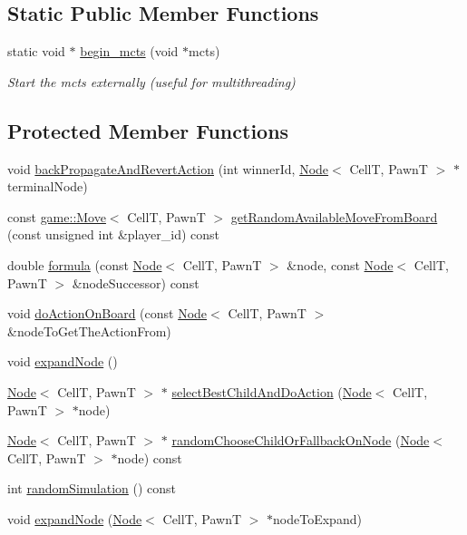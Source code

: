 \subsection*{Static Public Member Functions}
\begin{DoxyCompactItemize}
\item 
static void $\ast$ \hyperlink{classmcts_1_1_m_c_t_s_ab1b102cd67bb285c669f3fbb405ef5aa}{begin\+\_\+mcts} (void $\ast$mcts)
\begin{DoxyCompactList}\small\item\em Start the mcts externally (useful for multithreading) \end{DoxyCompactList}\end{DoxyCompactItemize}
\subsection*{Protected Member Functions}
\begin{DoxyCompactItemize}
\item 
void \hyperlink{classmcts_1_1_m_c_t_s_a53275dba0c93543b2fa8c24ad928e4a8}{back\+Propagate\+And\+Revert\+Action} (int winner\+Id, \hyperlink{structmcts_1_1_node}{Node}$<$ CellT, PawnT $>$ $\ast$terminal\+Node)
\item 
const \hyperlink{structgame_1_1_move}{game\+::\+Move}$<$ CellT, PawnT $>$ \hyperlink{classmcts_1_1_m_c_t_s_a3e918b416dfe1e5155b077788936f137}{get\+Random\+Available\+Move\+From\+Board} (const unsigned int \&player\+\_\+id) const
\item 
double \hyperlink{classmcts_1_1_m_c_t_s_ac75ac1b12fbb40dca468f1c31a9fc8cd}{formula} (const \hyperlink{structmcts_1_1_node}{Node}$<$ CellT, PawnT $>$ \&node, const \hyperlink{structmcts_1_1_node}{Node}$<$ CellT, PawnT $>$ \&node\+Successor) const
\item 
void \hyperlink{classmcts_1_1_m_c_t_s_a9b161c003bc21fe3910d7800c09fff1d}{do\+Action\+On\+Board} (const \hyperlink{structmcts_1_1_node}{Node}$<$ CellT, PawnT $>$ \&node\+To\+Get\+The\+Action\+From)
\item 
void \hyperlink{classmcts_1_1_m_c_t_s_a8c65e74d070a037e5ad0331a39379c9c}{expand\+Node} ()
\item 
\hyperlink{structmcts_1_1_node}{Node}$<$ CellT, PawnT $>$ $\ast$ \hyperlink{classmcts_1_1_m_c_t_s_a5a3c4a056b0611c19839d6757871653b}{select\+Best\+Child\+And\+Do\+Action} (\hyperlink{structmcts_1_1_node}{Node}$<$ CellT, PawnT $>$ $\ast$node)
\item 
\hyperlink{structmcts_1_1_node}{Node}$<$ CellT, PawnT $>$ $\ast$ \hyperlink{classmcts_1_1_m_c_t_s_a6b5686f91610bb4f46c395634a17a5b8}{random\+Choose\+Child\+Or\+Fallback\+On\+Node} (\hyperlink{structmcts_1_1_node}{Node}$<$ CellT, PawnT $>$ $\ast$node) const
\item 
int \hyperlink{classmcts_1_1_m_c_t_s_ad465558c1f4933cae2a32ff7394fc49b}{random\+Simulation} () const
\item 
void \hyperlink{classmcts_1_1_m_c_t_s_a08a528ef0f9ad4b113d56b96718f6dfc}{expand\+Node} (\hyperlink{structmcts_1_1_node}{Node}$<$ CellT, PawnT $>$ $\ast$node\+To\+Expand)
\end{DoxyCompactItemize}


